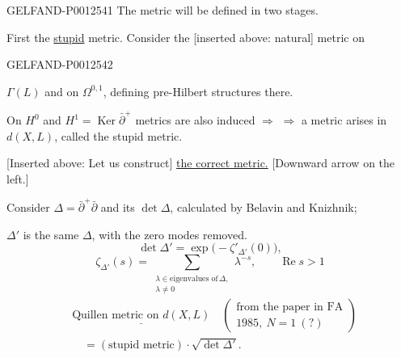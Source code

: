 \begin{GelfandAdjacentEvidence}{GELFAND-P001254}{1}
The metric will be defined in two stages.

First the \underline{stupid} metric. Consider the [inserted above: natural] metric on
\end{GelfandAdjacentEvidence}
\begin{GelfandAdjacentEvidence}{GELFAND-P001254}{2}

$\Gamma(L)$ and on $\Omega^{0,1}$,
defining pre-Hilbert structures there.

On $H^0$ and $H^1=\operatorname{Ker}\bar\partial^{+}$ metrics are also induced
$\Rightarrow$\newline
$\Rightarrow$ a metric arises in $d(X,L)$, called the stupid metric.

[Inserted above: Let us construct] \underline{the correct metric.}
[Downward arrow on the left.]

Consider $\Delta=\bar\partial^{+}\bar\partial$ and its $\det\Delta$, calculated by Belavin and Knizhnik;

$\Delta'$ is the same $\Delta$, with the zero modes removed.
\begin{equation*}
\det\Delta'=\exp\bigl(-\zeta'_{\Delta'}(0)\bigr),
\end{equation*}
\begin{equation*}
\zeta_{\Delta'}(s)=
\sum_{\substack{\lambda\in\text{eigenvalues of}\,\Delta,\\\lambda\ne0}}
\lambda^{-s},\qquad\operatorname{Re}s>1
\end{equation*}
\begin{equation*}
\begin{aligned}
&\underline{\text{Quillen metric on }d(X,L)}
\quad\left(\substack{\text{from the paper in FA}\\1985,\ N=1\ (?) }\right)\\
&\hspace{1em}=(\text{stupid metric})\cdot\sqrt{\det\Delta'}.
\end{aligned}\tag{7}
\end{equation*}
\end{GelfandAdjacentEvidence}
